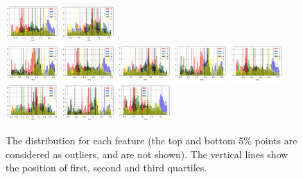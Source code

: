 \documentclass[11pt]{article}
\begin{document}
\begin{figure}[H]
  \includegraphics[width=0.18\textwidth]{../code/Task2/Analysis/Hist-Z21}
  \includegraphics[width=0.18\textwidth]{../code/Task2/Analysis/Hist-X31} \\
  \includegraphics[width=0.18\textwidth]{../code/Task2/Analysis/Hist-Y31}
  \includegraphics[width=0.18\textwidth]{../code/Task2/Analysis/Hist-Z31}
  \includegraphics[width=0.18\textwidth]{../code/Task2/Analysis/Hist-X41}
  \includegraphics[width=0.18\textwidth]{../code/Task2/Analysis/Hist-Y41}
  \includegraphics[width=0.18\textwidth]{../code/Task2/Analysis/Hist-Z41} \\
  \includegraphics[width=0.18\textwidth]{../code/Task2/Analysis/Hist-X51}
  \includegraphics[width=0.18\textwidth]{../code/Task2/Analysis/Hist-Y51}
  \includegraphics[width=0.18\textwidth]{../code/Task2/Analysis/Hist-Z51}
  \caption{The distribution for each feature (the top and bottom $5\%$ points are considered as outliers, and are not shown). The vertical lines show the position of first, second and third quartiles.}
  \label{task-2-data-distribution-feature}
\end{figure}
\end{document}
